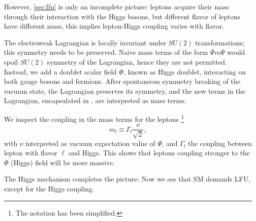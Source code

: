 However, \autoref{sec:lfu} is only an incomplete picture:
leptons acquire their mass through their interaction with the Higgs bosons,
but different flavor of leptons have different mass, this implies lepton-Higgs
coupling varies with flavor.

The electroweak Lagrangian is locally invariant under $SU(2)$ transformations;
this symmetry needs to be preserved.
Naive mass terms of the form $\bar{\Psi} m \Psi$
would spoil $SU(2)$ symmetry of the Lagrangian, hence they are not permitted.
Instead, we add a doublet scalar field $\Phi$, known as Higgs doublet,
interacting on both gauge bosons and fermions.
After spontaneous symmetry breaking of the vacuum state, the Lagrangian
preserves its symmetry, and the new terms in the Lagrangian, encapsulated in
, are interpreted as mass terms.

We inspect the coupling in the mass terms for the
leptons \cite{Langacker:2010zza}\footnote{
    The notation has been simplified.
}
\begin{equation}
    m_l \equiv \Gamma_l \frac{\nu}{\sqrt{2}},
\end{equation}
with $\nu$ interpreted as vacuum expectation value of $\Phi$, and $\Gamma_l$ the
coupling between lepton with flavor $\ell$ and Higgs.
This shows that leptons coupling stronger to the $\Phi$ (Higgs) field will be
more massive.

The Higgs mechanism completes the picture:
Now we see that SM demands LFU, except for the Higgs coupling.
